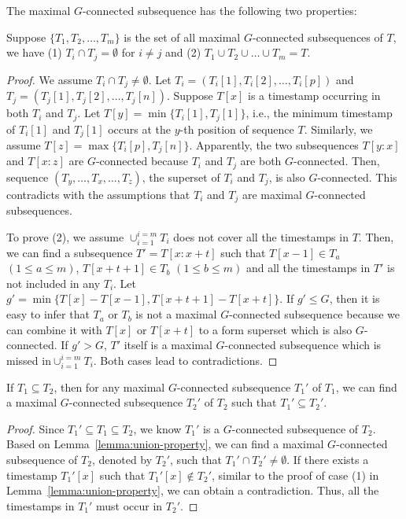 The maximal $G$-connected subsequence has the following two properties:
\begin{lemma}\label{lemma:union-property}
Suppose $\{T_1,T_2,\ldots,T_m\}$ is the set of all maximal $G$-connected subsequences of $T$, we have (1) $T_i\cap T_j=\emptyset$ for $i\neq j$ and (2) $T_1\cup T_2\cup\ldots\cup T_m=T$.
\end{lemma}
\begin{proof}
We assume $T_i\cap T_j\neq \emptyset$. Let $T_i=(T_i[1], T_i[2],\ldots,T_i[p])$ and $T_j= (T_j[1], T_j[2],\ldots,T_j[n])$. Suppose $T[x]$ is a timestamp occurring in both $T_i$ and $T_j$. Let $T[y]=\min\{T_i[1],T_j[1]\}$, i.e., the minimum timestamp of $T_i[1]$ and $T_j[1]$ occurs at the $y$-th position of sequence $T$. Similarly, we assume $T[z]=\max\{T_i[p], T_j[n]\}$. Apparently, the two subsequences $T[y:x]$ and $T[x:z]$ are $G$-connected because $T_i$ and $T_j$ are both $G$-connected. Then, sequence $(T_y,\ldots,T_x,\ldots,T_z)$, the superset of $T_i$ and $T_j$, is also $G$-connected. This contradicts with the assumptions that $T_i$ and $T_j$ are maximal $G$-connected subsequences. 




To prove (2), we assume $\cup_{i=1}^{i=m} T_i$ does not cover all the timestamps in $T$. Then, we can find a subsequence $T'=T[x:x+t]$ such that $T[x-1]\in T_a$ $(1\leq a\leq m)$, $T[x+t+1]\in T_b$ $(1\leq b\leq m)$ and all the timestamps in $T'$ is not included in any $T_i$. Let $g'=\min\{T[x]-T[x-1], T[x+t+1]-T[x+t]\}$. If $g'\leq G$, then it is easy to infer that $T_a$ or $T_b$ is not a maximal $G$-connected subsequence because we can combine it with $T[x]$ or $T[x+t]$  to a form superset which is also $G$-connected. If $g'>G$, $T'$ itself is a maximal $G$-connected subsequence which is missed in$\cup_{i=1}^{i=m} T_i$. Both cases lead to contradictions.
\end{proof}




\begin{lemma}\label{lemma:subset-property}
If $T_1 \subseteq T_2$, then for any maximal $G$-connected subsequence $T_1'$ of $T_1$, we can find a maximal $G$-connected subsequence $T_2'$ of $T_2$ such that %
$T_1' \subseteq T_2'$.
\end{lemma}
\begin{proof}
Since $T_1' \subseteq T_1 \subseteq T_2 $, we know $T_1'$ is a $G$-connected subsequence of $T_2$. Based on Lemma~\ref{lemma:union-property}, we can find a maximal $G$-connected subsequence of $T_2$, denoted by $T_2'$, such that $T_1'\cap T_2'\neq \emptyset$. If there exists a timestamp $T_1'[x]$ such that $T_1'[x]\notin T_2'$, similar to the proof of case (1) in Lemma~\ref{lemma:union-property}, we can obtain a contradiction. Thus, all the timestamps in $T_1'$ must occur in $T_2'$.
\end{proof}

